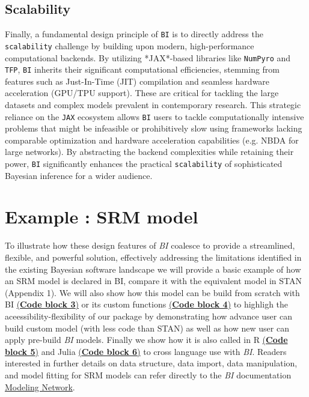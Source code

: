 \documentclass[num-refs]{wiley-article}
\begin{document}
\subsection{Scalability}\label{Scalability}
 Finally, a fundamental design principle of \texttt{BI} is to directly address the \texttt{scalability} challenge by building upon modern, high-performance computational backends. By utilizing *JAX*-based libraries like \texttt{NumPyro} and \texttt{TFP}, \texttt{BI} inherits their significant computational efficiencies, stemming from features such as Just-In-Time (JIT) compilation and seamless hardware acceleration (GPU/TPU support). These are critical for tackling the large datasets and complex models prevalent in contemporary research. This strategic reliance on the \texttt{JAX} ecosystem allows \texttt{BI} users to tackle computationally intensive problems that might be infeasible or prohibitively slow using frameworks lacking comparable optimization and hardware acceleration capabilities (e.g. NBDA for large networks). By abstracting the backend complexities while retaining their power, \texttt{BI} significantly enhances the practical \texttt{scalability} of sophisticated Bayesian inference for a wider audience.


\section{Example : SRM model}
To illustrate how these design features of \textit{BI} coalesce to provide a streamlined, flexible, and powerful solution, effectively addressing the limitations identified in the existing Bayesian software landscape we will provide a basic example of how an SRM model is declared in BI, compare it with the equivalent model in  STAN (Appendix 1). We will also show how this model can be build from scratch with BI \hyperref[code:block3_example]{(\textbf{Code block 3})} or its custom functions \hyperref[code:block4_example]{(\textbf{Code block 4})} to highligh the aceessibility-flexibility of our package by demonstrating how advance user can build custom model (with less code than STAN) as well as how new user can apply pre-build \textit{BI} models. Finally we show how it is also called in R \hyperref[code:block5_example]{(\textbf{Code block 5})} and Julia \hyperref[code:block6_example]{(\textbf{Code block 6})} to cross language use with \textit{BI}. Readers interested in further details on data structure, data import, data manipulation, and model fitting for SRM models can refer directly to the \textit{BI} documentation \href{https://s-sosa.com/BI/22.%20Network%20model.html}{Modeling Network}.
\end{document}

